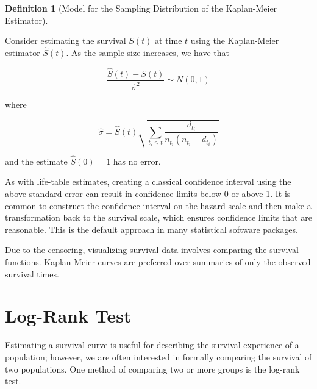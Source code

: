 \documentclass[
  letterpaper,
  DIV=11,
  numbers=noendperiod]{scrreprt}
\theoremstyle{definition}
\newtheorem{definition}{Definition}[chapter]
\theoremstyle{definition}
\theoremstyle{remark}
\begin{document}
\begin{definition}[Model for the Sampling Distribution of the
Kaplan-Meier
Estimator]\protect\hypertarget{def-samp-distn-km}{}\label{def-samp-distn-km}

Consider estimating the survival \(S(t)\) at time \(t\) using the
Kaplan-Meier estimator \(\widehat{S}(t)\). As the sample size increases,
we have that

\[\frac{\widehat{S}(t) - S(t)}{\widehat{\sigma}^2} \sim N(0, 1)\]

where

\[\widehat{\sigma} = \widehat{S}(t) \sqrt{\sum\limits_{t_i \leq t} \frac{d_{t_i}}{n_{t_i} \left(n_{t_i} - d_{t_i}\right)}}\]

and the estimate \(\widehat{S}(0) = 1\) has no error.

\end{definition}

As with life-table estimates, creating a classical confidence interval
using the above standard error can result in confidence limits below 0
or above 1. It is common to construct the confidence interval on the
hazard scale and then make a transformation back to the survival scale,
which ensures confidence limits that are reasonable. This is the default
approach in many statistical software packages.

\begin{tcolorbox}[enhanced jigsaw, left=2mm, toprule=.15mm, arc=.35mm, breakable, opacitybacktitle=0.6, opacityback=0, rightrule=.15mm, colbacktitle=quarto-callout-tip-color!10!white, coltitle=black, leftrule=.75mm, toptitle=1mm, colframe=quarto-callout-tip-color-frame, titlerule=0mm, title=\textcolor{quarto-callout-tip-color}{\faLightbulb}\hspace{0.5em}{Big Idea}, bottomrule=.15mm, colback=white, bottomtitle=1mm]

Due to the censoring, visualizing survival data involves comparing the
survival functions. Kaplan-Meier curves are preferred over summaries of
only the observed survival times.

\end{tcolorbox}

\hypertarget{log-rank-test}{%
\section{Log-Rank Test}\label{log-rank-test}}

Estimating a survival curve is useful for describing the survival
experience of a population; however, we are often interested in formally
comparing the survival of two populations. One method of comparing two
or more groups is the log-rank test.
\end{document}
